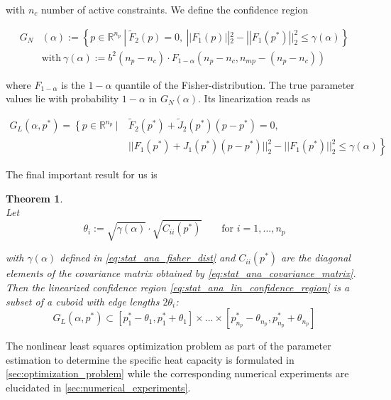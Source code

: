\documentclass{scrartcl}[12pt, halfparskip]
\numberwithin{equation}{section}
\numberwithin{figure}{section}
\numberwithin{table}{section}
\newtheorem{Theorem}{Theorem}
\begin{document}
with $n_c$ number of active constraints. We define the confidence region

\begin{align}
	G_N&(\alpha)  := \left\{ p \in \mathbb{R}^{n_p} \ | \ \tilde{F}_2(p) = 0, \ || F_1(p) ||_2^2 - || F_1(p^*) ||_2^2 \le \gamma(\alpha) \right\} \\
	& \text{with} \ \gamma(\alpha) := b^2 (n_p - n_c) \cdot F_{1-\alpha}(n_p - n_c, n_{mp} - (n_p - n_c)) \label{eq:stat_ana_fisher_dist}
\end{align} 

where $F_{1-\alpha}$ is the $1-\alpha$ quantile of the Fisher-distribution. The true parameter values lie with probability $1-\alpha$ in $G_N(\alpha)$. Its linearization reads as

\begin{align}
	G_L(\alpha, p^*) = \left\{ p \in \mathbb{R}^{n_p} \ | \ \right. & \tilde{F}_2(p^*) + \tilde{J}_2(p^*)(p - p^*) = 0, \label{eq:stat_ana_lin_confidence_region} \\ 
	& \left. || F_1(p^*) + J_1(p^*)(p - p^*) ||_2^2 - || F_1(p^*)||_2^2 \le \gamma(\alpha) \right\} \nonumber	
\end{align}



The final important result for us is

\begin{Theorem} \mbox{}\\
	Let 
	\begin{equation}
		\theta_i := \sqrt{\gamma(\alpha)} \cdot \sqrt{C_{ii}(p^*)} \qquad \text{for } i=1,...,n_p
	\end{equation}
	
with $\gamma(\alpha)$ defined in \cref{eq:stat_ana_fisher_dist} and $C_{ii}(p^*)$ are the diagonal elements of the covariance matrix obtained by \cref{eq:stat_ana_covariance_matrix}. Then the linearized confidence region \cref{eq:stat_ana_lin_confidence_region} is a subset of a cuboid with edge lengths $2 \theta_i$:
	\begin{equation}
		G_L(\alpha, p^*) \subset [p_1^* - \theta_1, p_1^* + \theta_1] \times ... \times [p_{n_p}^* - \theta_{n_p}, p_{n_p}^* + \theta_{n_p}]
	\end{equation}
	
\end{Theorem}


\vspace{0.5cm}
The nonlinear least squares optimization problem as part of the parameter estimation to determine the specific heat capacity is formulated in \cref{sec:optimization_problem} while the corresponding numerical experiments are elucidated in \cref{sec:numerical_experiments}.
\end{document}
